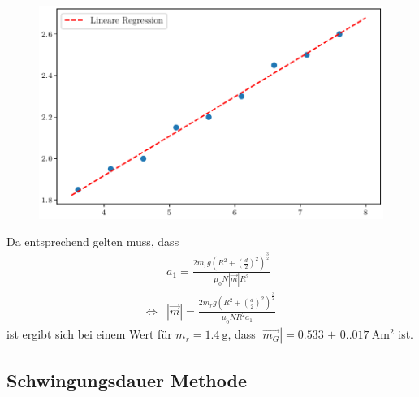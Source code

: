 \begin{figure}[H]
    \centering
    \includegraphics{plot1.pdf}
    \label{fig:grav}
\end{figure}
Da entsprechend gelten muss, dass
\begin{align}
    & a_1=\frac{2m_rg\left(R^2+\left(\frac{d}{2}\right)^2\right)^\frac{3}{2}}{\mu_0N|\vec{m}|R^2} \\
    \iff & |\vec{m}|=\frac{2m_rg\left(R^2+\left(\frac{d}{2}\right)^2\right)^\frac{3}{2}}{\mu_0NR^2a_1}
\end{align}
ist ergibt sich bei einem Wert für $m_r=\qty{1.4}{\gram}$, dass $|\vec{m_G}|=\qty{0.533(0.017)}{\ampere\meter\squared}$ ist.

\subsection{Schwingungsdauer Methode}

